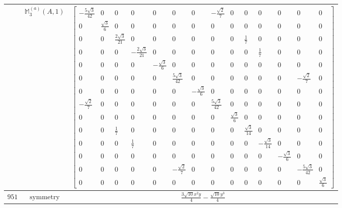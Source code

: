 \documentclass[fleqn,8pt,landscape]{jsarticle}
\begin{document}
\begin{longtable}{ccc}
$  $ & $ \mathbb{M}_{3}^{(a)}(A,1) $ & $ \begin{bmatrix} - \frac{5 \sqrt{3}}{42} & 0 & 0 & 0 & 0 & 0 & 0 & - \frac{\sqrt{2}}{7} & 0 & 0 & 0 & 0 & 0 & 0 \\ 0 & \frac{\sqrt{3}}{6} & 0 & 0 & 0 & 0 & 0 & 0 & 0 & 0 & 0 & 0 & 0 & 0 \\ 0 & 0 & \frac{2 \sqrt{3}}{21} & 0 & 0 & 0 & 0 & 0 & 0 & \frac{1}{7} & 0 & 0 & 0 & 0 \\ 0 & 0 & 0 & - \frac{2 \sqrt{3}}{21} & 0 & 0 & 0 & 0 & 0 & 0 & \frac{1}{7} & 0 & 0 & 0 \\ 0 & 0 & 0 & 0 & - \frac{\sqrt{3}}{6} & 0 & 0 & 0 & 0 & 0 & 0 & 0 & 0 & 0 \\ 0 & 0 & 0 & 0 & 0 & \frac{5 \sqrt{3}}{42} & 0 & 0 & 0 & 0 & 0 & 0 & - \frac{\sqrt{2}}{7} & 0 \\ 0 & 0 & 0 & 0 & 0 & 0 & - \frac{\sqrt{3}}{6} & 0 & 0 & 0 & 0 & 0 & 0 & 0 \\ - \frac{\sqrt{2}}{7} & 0 & 0 & 0 & 0 & 0 & 0 & \frac{5 \sqrt{3}}{42} & 0 & 0 & 0 & 0 & 0 & 0 \\ 0 & 0 & 0 & 0 & 0 & 0 & 0 & 0 & \frac{\sqrt{3}}{6} & 0 & 0 & 0 & 0 & 0 \\ 0 & 0 & \frac{1}{7} & 0 & 0 & 0 & 0 & 0 & 0 & \frac{\sqrt{3}}{14} & 0 & 0 & 0 & 0 \\ 0 & 0 & 0 & \frac{1}{7} & 0 & 0 & 0 & 0 & 0 & 0 & - \frac{\sqrt{3}}{14} & 0 & 0 & 0 \\ 0 & 0 & 0 & 0 & 0 & 0 & 0 & 0 & 0 & 0 & 0 & - \frac{\sqrt{3}}{6} & 0 & 0 \\ 0 & 0 & 0 & 0 & 0 & - \frac{\sqrt{2}}{7} & 0 & 0 & 0 & 0 & 0 & 0 & - \frac{5 \sqrt{3}}{42} & 0 \\ 0 & 0 & 0 & 0 & 0 & 0 & 0 & 0 & 0 & 0 & 0 & 0 & 0 & \frac{\sqrt{3}}{6} \end{bmatrix} $ \\ \hline
$ 951 $ & $ \text{symmetry} $ & $ \frac{3 \sqrt{10} x^{2} y}{4} - \frac{\sqrt{10} y^{3}}{4} $ \\

\end{longtable}
\end{document}
